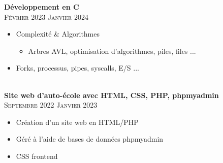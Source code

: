 \documentclass[oneside]{article}
\begin{document}
{\begin{minipage}[t][\dimexpr\textheight-2\fboxrule-2\fboxsep\relax][t]{\dimexpr0.7\textwidth-2\fboxrule-2\fboxsep\relax}
        {\large \textbf{Développement en C}} \\
        {\scshape{}\selectfont\footnotesize Février 2023 \textendash{} Janvier 2024} \\
        \vspace{-\baselineskip}
        \vspace{0.2cm}
        \begin{itemize}
            \setlength{\itemsep}{-5pt}
            \item Complexité \& Algorithmes
            \vspace{-\baselineskip}
            \vspace{0.2cm}
            \begin{itemize}
                \item Arbres AVL, optimisation d'algorithmes, piles, files ...
            \end{itemize}
            \item Forks, processus, pipes, syscalls, E/S ...
        \end{itemize} \\

        {\large \textbf{Site web d'auto-école avec HTML, CSS, PHP, phpmyadmin}} \\
        {\scshape{}\selectfont\footnotesize Septembre 2022 \textendash{} Janvier 2023} \\
        \vspace{-\baselineskip}
        \vspace{0.2cm}
        \begin{itemize}
            \setlength{\itemsep}{-5pt}
            \item Création d'un site web en HTML/PHP
            \item Géré à l'aide de bases de données phpmyadmin
            \item CSS frontend
        \end{itemize} \\
        
        \vfill%
    \end{minipage}
}%
\end{document}
